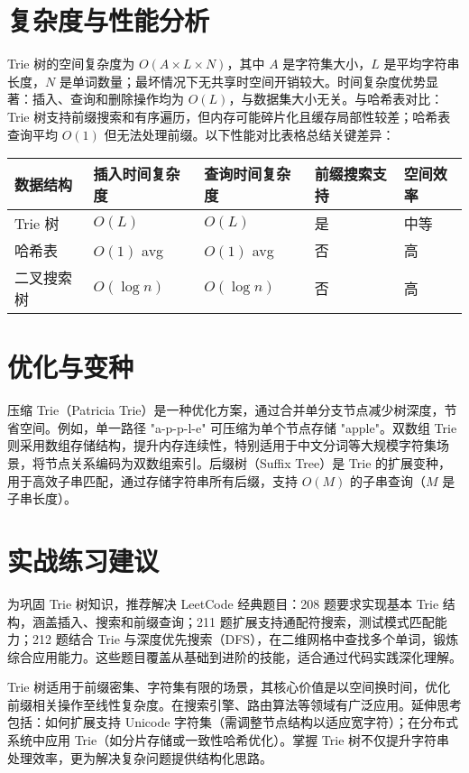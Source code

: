 \chapter{复杂度与性能分析}
Trie 树的空间复杂度为 $O(A \times L \times N)$，其中 $A$ 是字符集大小，$L$ 是平均字符串长度，$N$ 是单词数量；最坏情况下无共享时空间开销较大。时间复杂度优势显著：插入、查询和删除操作均为 $O(L)$，与数据集大小无关。与哈希表对比：Trie 树支持前缀搜索和有序遍历，但内存可能碎片化且缓存局部性较差；哈希表查询平均 $O(1)$ 但无法处理前缀。以下性能对比表格总结关键差异：\par
\begin{table}[H]
\centering
\begin{tabular}{|l|l|l|l|l|}
\hline
数据结构 & 插入时间复杂度 & 查询时间复杂度 & 前缀搜索支持 & 空间效率 \\
\hline
Trie 树 & $O(L)$ & $O(L)$ & 是 & 中等 \\
\hline
哈希表 & $O(1)$ avg & $O(1)$ avg & 否 & 高 \\
\hline
二叉搜索树 & $O(\log n)$ & $O(\log n)$ & 否 & 高 \\
\hline
\end{tabular}
\end{table}
\chapter{优化与变种}
压缩 Trie（Patricia Trie）是一种优化方案，通过合并单分支节点减少树深度，节省空间。例如，单一路径 "a-p-p-l-e" 可压缩为单个节点存储 "apple"。双数组 Trie 则采用数组存储结构，提升内存连续性，特别适用于中文分词等大规模字符集场景，将节点关系编码为双数组索引。后缀树（Suffix Tree）是 Trie 的扩展变种，用于高效子串匹配，通过存储字符串所有后缀，支持 $O(M)$ 的子串查询（$M$ 是子串长度）。\par
\chapter{实战练习建议}
为巩固 Trie 树知识，推荐解决 LeetCode 经典题目：208 题要求实现基本 Trie 结构，涵盖插入、搜索和前缀查询；211 题扩展支持通配符搜索，测试模式匹配能力；212 题结合 Trie 与深度优先搜索（DFS），在二维网格中查找多个单词，锻炼综合应用能力。这些题目覆盖从基础到进阶的技能，适合通过代码实践深化理解。\par
Trie 树适用于前缀密集、字符集有限的场景，其核心价值是以空间换时间，优化前缀相关操作至线性复杂度。在搜索引擎、路由算法等领域有广泛应用。延伸思考包括：如何扩展支持 Unicode 字符集（需调整节点结构以适应宽字符）；在分布式系统中应用 Trie（如分片存储或一致性哈希优化）。掌握 Trie 树不仅提升字符串处理效率，更为解决复杂问题提供结构化思路。\par
